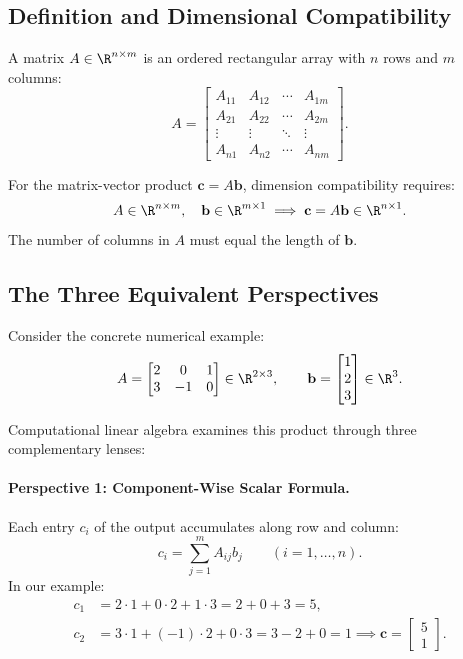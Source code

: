 \subsection{Definition and Dimensional Compatibility}

A matrix $A \in \R^{n \times m}$ is an ordered rectangular array with $n$ rows and $m$ columns:
\begin{equation}
    A = \begin{bmatrix}
        A_{11} & A_{12} & \cdots & A_{1m} \\
        A_{21} & A_{22} & \cdots & A_{2m} \\
        \vdots & \vdots & \ddots & \vdots \\
        A_{n1} & A_{n2} & \cdots & A_{nm}
    \end{bmatrix}.
\end{equation}

For the matrix-vector product $\mathbf{c} = A \mathbf{b}$, dimension compatibility requires:
\begin{equation}
    A \in \R^{n \times m}, \quad \mathbf{b} \in \R^{m \times 1} \implies \mathbf{c} = A \mathbf{b} \in \R^{n \times 1}.
\end{equation}
The number of columns in $A$ must equal the length of $\mathbf{b}$.

\subsection{The Three Equivalent Perspectives}

Consider the concrete numerical example:
\begin{equation}
    A = \begin{bmatrix} 2 & 0 & 1 \\ 3 & -1 & 0 \end{bmatrix} \in \R^{2 \times 3}, \qquad \mathbf{b} = \begin{bmatrix} 1 \\ 2 \\ 3 \end{bmatrix} \in \R^3.
\end{equation}

Computational linear algebra examines this product through three complementary lenses:

\paragraph{Perspective 1: Component-Wise Scalar Formula.}
Each entry $c_i$ of the output accumulates along row and column:
\begin{equation}
    c_i = \sum_{j=1}^m A_{ij} b_j \qquad (i = 1, \dots, n).
\end{equation}
In our example:
\begin{align}
    c_1 &= 2 \cdot 1 + 0 \cdot 2 + 1 \cdot 3 = 2 + 0 + 3 = 5, \\
    c_2 &= 3 \cdot 1 + (-1) \cdot 2 + 0 \cdot 3 = 3 - 2 + 0 = 1 \implies \mathbf{c} = \begin{bmatrix} 5 \\ 1 \end{bmatrix}.
\end{align}

